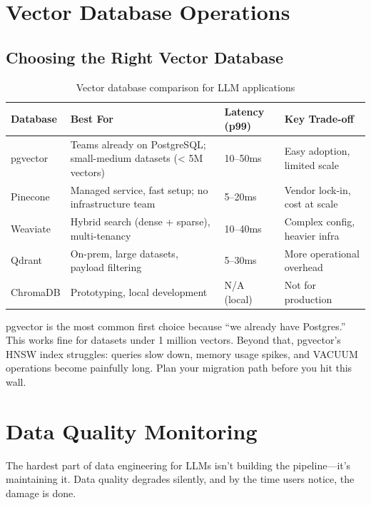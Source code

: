 \section{Vector Database Operations}

\subsection{Choosing the Right Vector Database}

\begin{table}[htbp]
\centering
\caption{Vector database comparison for LLM applications}
\label{tab:vector-dbs}
\begin{tabularx}{\textwidth}{lXXX}
\toprule
\textbf{Database} & \textbf{Best For} & \textbf{Latency (p99)} & \textbf{Key Trade-off} \\
\midrule
pgvector & Teams already on PostgreSQL; small-medium datasets (< 5M vectors) & 10--50ms & Easy adoption, limited scale \\
Pinecone & Managed service, fast setup; no infrastructure team & 5--20ms & Vendor lock-in, cost at scale \\
Weaviate & Hybrid search (dense + sparse), multi-tenancy & 10--40ms & Complex config, heavier infra \\
Qdrant & On-prem, large datasets, payload filtering & 5--30ms & More operational overhead \\
ChromaDB & Prototyping, local development & N/A (local) & Not for production \\
\bottomrule
\end{tabularx}
\end{table}

\begin{cautionbox}
pgvector is the most common first choice because ``we already have Postgres.'' This works fine for datasets under 1 million vectors. Beyond that, pgvector's HNSW index struggles: queries slow down, memory usage spikes, and VACUUM operations become painfully long. Plan your migration path before you hit this wall.
\end{cautionbox}

\section{Data Quality Monitoring}

The hardest part of data engineering for LLMs isn't building the pipeline---it's maintaining it. Data quality degrades silently, and by the time users notice, the damage is done.

